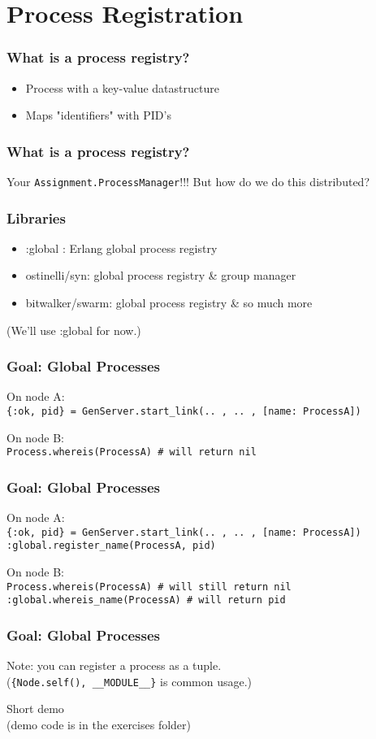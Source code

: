 \section{Process Registration}

\frame{\tableofcontents[currentsection]}

\begin{frame}
    \frametitle{What is a process registry?}
    \begin{itemize}
        \item Process with a key-value datastructure 
        \item Maps "identifiers" with PID's
    \end{itemize}
\end{frame}

\begin{frame}
    \frametitle{What is a process registry?}
    Your \texttt{Assignment.ProcessManager}!!! %
    \vfill
    But how do we do this distributed?
\end{frame}

\begin{frame}
    \frametitle{Libraries}
    \begin{itemize}
        \item :global : Erlang global process registry
        \item ostinelli/syn: global process registry \& group manager
        \item bitwalker/swarm: global process registry \& so much more
    \end{itemize}
    
    \vfill

    (We'll use :global for now.)
\end{frame}

\begin{frame}
    \frametitle{Goal: Global Processes}
    On node A: \\
    \texttt{\{:ok, pid\} = GenServer.start\_link(.. , .. , [name: ProcessA])} 

    \vfill

    On node B: \\
    \texttt{Process.whereis(ProcessA) \# will return nil} 
\end{frame}

\begin{frame}
    \frametitle{Goal: Global Processes}
    On node A: \\
    \texttt{\{:ok, pid\} = GenServer.start\_link(.. , .. , [name: ProcessA])} \\
    \texttt{:global.register\_name(ProcessA, pid)}

    \vfill

    On node B: \\
    \texttt{Process.whereis(ProcessA) \# will still return nil} \\ 
    \texttt{:global.whereis\_name(ProcessA) \# will return pid} \\ 
\end{frame}

\begin{frame}
    \frametitle{Goal: Global Processes}
    Note: you can register a process as a tuple. \\ 
    (\texttt{\{Node.self(), \_\_MODULE\_\_\}} is common usage.)

    \vfill

    Short demo\\
    \tiny{(demo code is in the exercises folder)}
\end{frame}
